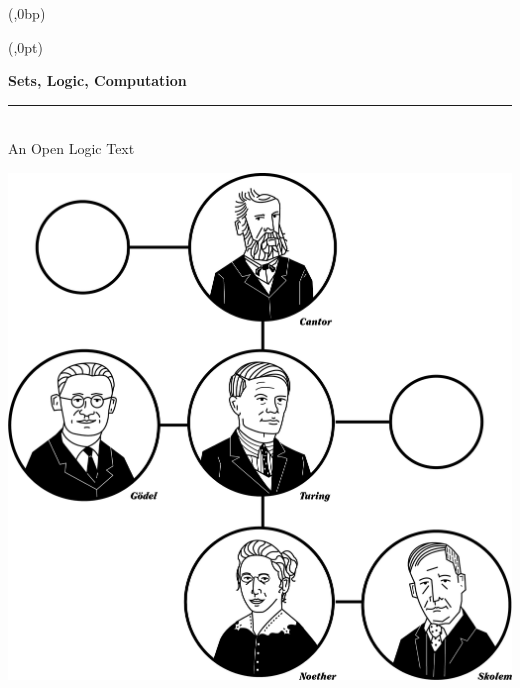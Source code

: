 \documentclass{memoir}
\newlength{\coverheight}
\newlength{\spinewidth}
\newlength{\spinepos} %
\newlength{\coverpos} %
\begin{document}
\pagestyle{empty}


\pagecolor{leadbeater}

\begin{textblock*}{\spinewidth}(\spinepos,0bp)%
\noindent\hfil{}\hfil
\end{textblock*}
\newbox\adjust
\begin{textblock*}{\spinepos}(\coverpos,0pt)
  \noindent\hfil
  \begin{minipage}[b][\coverheight][s]{.8\spinepos}
    \vspace{2cm}
      \begin{raggedright}
  \fontsize{32pt}{34pt}\selectfont\bfseries\sffamily%
  Sets, Logic, Computation\\
  \normalfont\fontsize{18pt}{0pt}\selectfont\bfseries\itshape%
    \rule{.8\spinepos}{5pt}\\[5pt]
  An Open Logic Text
\end{raggedright}
\noindent\vskip2cm\includegraphics[width=.8\spinepos]{illustrations/Cover}
  \end{minipage}
  \hfil
  \end{textblock*}
\end{document}
